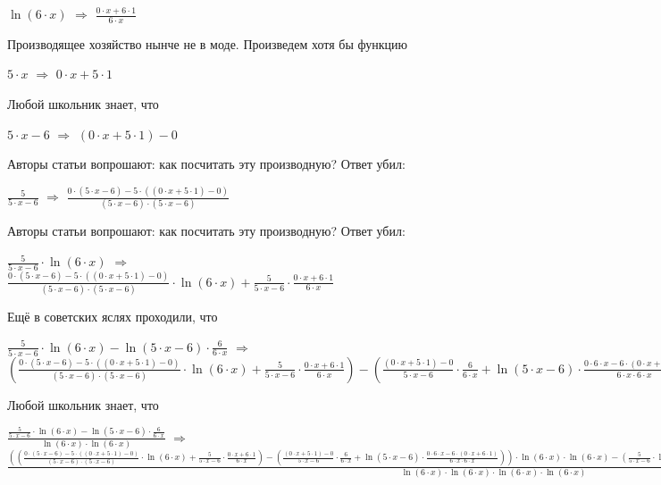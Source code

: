 \documentclass{article}
\begin{document}
$ \ln (6 \cdot x)$ $\Rightarrow$ $\frac{0 \cdot x + 6 \cdot 1}{6 \cdot x}$

Производящее хозяйство нынче не в моде. Произведем хотя бы функцию

$5 \cdot x$ $\Rightarrow$ $0 \cdot x + 5 \cdot 1$

Любой школьник знает, что

$5 \cdot x - 6$ $\Rightarrow$ $(0 \cdot x + 5 \cdot 1) - 0$

Авторы статьи вопрошают: как посчитать эту производную? Ответ убил:

$\frac{5}{5 \cdot x - 6}$ $\Rightarrow$ $\frac{0 \cdot (5 \cdot x - 6) - 5 \cdot ((0 \cdot x + 5 \cdot 1) - 0)}{(5 \cdot x - 6) \cdot (5 \cdot x - 6)}$

Авторы статьи вопрошают: как посчитать эту производную? Ответ убил:

$\frac{5}{5 \cdot x - 6} \cdot  \ln (6 \cdot x)$ $\Rightarrow$ $\frac{0 \cdot (5 \cdot x - 6) - 5 \cdot ((0 \cdot x + 5 \cdot 1) - 0)}{(5 \cdot x - 6) \cdot (5 \cdot x - 6)} \cdot  \ln (6 \cdot x) + \frac{5}{5 \cdot x - 6} \cdot \frac{0 \cdot x + 6 \cdot 1}{6 \cdot x}$

Ещё в советских яслях проходили, что

$\frac{5}{5 \cdot x - 6} \cdot  \ln (6 \cdot x) -  \ln (5 \cdot x - 6) \cdot \frac{6}{6 \cdot x}$ $\Rightarrow$ $(\frac{0 \cdot (5 \cdot x - 6) - 5 \cdot ((0 \cdot x + 5 \cdot 1) - 0)}{(5 \cdot x - 6) \cdot (5 \cdot x - 6)} \cdot  \ln (6 \cdot x) + \frac{5}{5 \cdot x - 6} \cdot \frac{0 \cdot x + 6 \cdot 1}{6 \cdot x}) - (\frac{(0 \cdot x + 5 \cdot 1) - 0}{5 \cdot x - 6} \cdot \frac{6}{6 \cdot x} +  \ln (5 \cdot x - 6) \cdot \frac{0 \cdot 6 \cdot x - 6 \cdot (0 \cdot x + 6 \cdot 1)}{6 \cdot x \cdot 6 \cdot x})$

Любой школьник знает, что

$\frac{\frac{5}{5 \cdot x - 6} \cdot  \ln (6 \cdot x) -  \ln (5 \cdot x - 6) \cdot \frac{6}{6 \cdot x}}{ \ln (6 \cdot x) \cdot  \ln (6 \cdot x)}$ $\Rightarrow$ $\frac{((\frac{0 \cdot (5 \cdot x - 6) - 5 \cdot ((0 \cdot x + 5 \cdot 1) - 0)}{(5 \cdot x - 6) \cdot (5 \cdot x - 6)} \cdot  \ln (6 \cdot x) + \frac{5}{5 \cdot x - 6} \cdot \frac{0 \cdot x + 6 \cdot 1}{6 \cdot x}) - (\frac{(0 \cdot x + 5 \cdot 1) - 0}{5 \cdot x - 6} \cdot \frac{6}{6 \cdot x} +  \ln (5 \cdot x - 6) \cdot \frac{0 \cdot 6 \cdot x - 6 \cdot (0 \cdot x + 6 \cdot 1)}{6 \cdot x \cdot 6 \cdot x})) \cdot  \ln (6 \cdot x) \cdot  \ln (6 \cdot x) - (\frac{5}{5 \cdot x - 6} \cdot  \ln (6 \cdot x) -  \ln (5 \cdot x - 6) \cdot \frac{6}{6 \cdot x}) \cdot (\frac{0 \cdot x + 6 \cdot 1}{6 \cdot x} \cdot  \ln (6 \cdot x) +  \ln (6 \cdot x) \cdot \frac{0 \cdot x + 6 \cdot 1}{6 \cdot x})}{ \ln (6 \cdot x) \cdot  \ln (6 \cdot x) \cdot  \ln (6 \cdot x) \cdot  \ln (6 \cdot x)}$
\end{document}
